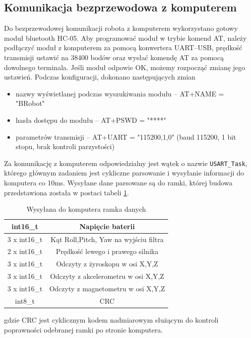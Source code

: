 \subsection{Komunikacja bezprzewodowa z komputerem}

Do bezprzewodowej komunikacji robota z komputerem wykorzystano gotowy moduł bluetooth HC-05. Aby programować moduł w trybie komend AT, należy podłączyć moduł z komputerem za pomocą konwertera UART--USB, prędkość transmisji ustawić na 38400 bodów oraz wysłać komendę AT za pomocą dowolnego terminala. Jeśli moduł odpowie OK, możemy rozpocząć zmianę jego ustawień. Podczas konfiguracji, dokonano następujących zmian
\begin{itemize}
    \item nazwy wyświetlanej podczas wyszukiwania modułu -- AT+NAME = "BRobot"
    \item hasła dostępu do modułu -- AT+PSWD = "****"
    \item parametrów transmisji -- AT+UART = "115200,1,0" (baud 115200, 1 bit stopu, brak kontroli parzystości)
\end{itemize}

Za komunikację z komputerem odpowiedzialny jest wątek o nazwie \texttt{USART\_Task}, którego głównym zadaniem jest cykliczne parsowanie i wysyłanie informacji do komputera co 10ms. Wysyłane dane parsowane są do ramki, której budowa przedstawiona została w postaci tabeli \ref{Ramka wysylana}.

\begin{table}[h!]
    \centering
    \caption{Wysyłana do komputera ramka danych}
    \begin{tabular}{|c|c|}
        \hline
        int16\_t & Napięcie baterii \\
        \hline
        3 x int16\_t & Kąt Roll,Pitch, Yaw na wyjściu filtra \\
        \hline
        2 x int16\_t & Prędkość lewego i prawego silnika \\
        \hline
        3 x int16\_t & Odczyty z żyroskopu w osi X,Y,Z \\
        \hline
        3 x int16\_t & Odczyty z akcelerometru w osi X,Y,Z \\
        \hline
        3 x int16\_t & Odczyty z magnetometru w osi X,Y,Z \\
        \hline
        int8\_t & CRC \\
        \hline
    \end{tabular}
    \label{Ramka wysylana}
\end{table}
gdzie CRC jest cyklicznym kodem nadmiarowym służącym do kontroli poprawności odebranej ramki po stronie komputera.

